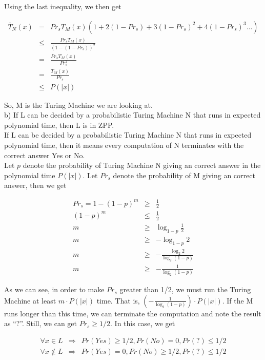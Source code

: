 \documentclass[12pt]{article}
\begin{document}
Using the last inequality, we then get

\begin{eqnarray*}
\overline {T}_N(x)
&=& Pr_s T_M(x) (1 + 2(1 - Pr_s) + 3(1 - Pr_s)^2 + 4(1 - Pr_s)^3 ...) \\
&\le& \frac {Pr_s T_M(x)} {(1 - (1 - Pr_s))^2} \\
&=& \frac {Pr_s T_M(x)} {Pr_s^2} \\
&=& \frac {T_M(x)}{Pr_s} \\
&\le& P(|x|)
\end{eqnarray*}

So, M is the Turing Machine we are looking at. \\

b) If L can be decided by a probabilistic Turing Machine N that runs
in expected polynomial time, then L is in ZPP. \\ 

If L can be decided by a probabilistic Turing Machine N that runs
in expected polynomial time, then it means every computation of N
terminates with the correct answer Yes or No. \\

Let $p$ denote the probability of Turing Machine N giving an correct
answer in the polynomial time $P(|x|)$. Let $Pr_s$ denote the
probability of M giving an correct answer, then we get 

\begin{eqnarray*}
Pr_s = 1 - (1 - p)^m &\ge& \frac {1}{2} \\
(1 - p)^m &\le& \frac {1}{2} \\
m &\ge& \log_{1-p} {\frac {1}{2}} \\
m &\ge& - \log_{1-p} {2} \\
m &\ge& - \frac {\log_2 {2}} {\log_2 {(1-p)}} \\
m &\ge& - \frac {1} {\log_2 {(1-p)}}
\end{eqnarray*}

As we can see, in order to make $Pr_s$ greater than 1/2, we must run
the Turing Machine at least $m \cdot P(|x|)$ time. That is, $(- \frac
{1} {\log_2 {(1-p)}}) \cdot P(|x|)$. If the M runs longer than this
time, we can terminate the computation and note the result as
``?''. Still, we can get $Pr_s \ge 1/2$. In this case, we get

\begin{eqnarray*}
\forall x \in L &\Rightarrow& Pr(Yes) \ge 1/2, Pr(No) = 0, Pr(?)
\le 1/2 \\
\forall x \notin L &\Rightarrow& Pr(Yes) = 0, Pr(No) \ge 1/2,
Pr(?) \le 1/2
\end{eqnarray*}
\end{document}
